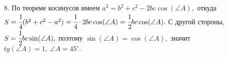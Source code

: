 8. По теореме косинусов имеем $a^2=b^2+c^2-2bc\cos(\angle A),$ откуда $S=\cfrac{1}{4}(b^2+c^2-a^2)=\cfrac{1}{4}\cdot 2bc\cos(\angle A)=\cfrac{1}{2}bc\cos(\angle A).$ С другой стороны, $S=\cfrac{1}{2}bc\sin(\angle A),$ поэтому $\sin(\angle A)=\cos(\angle A),$ значит $tg(\angle A)=1,\ \angle A=45^\circ.$\\
